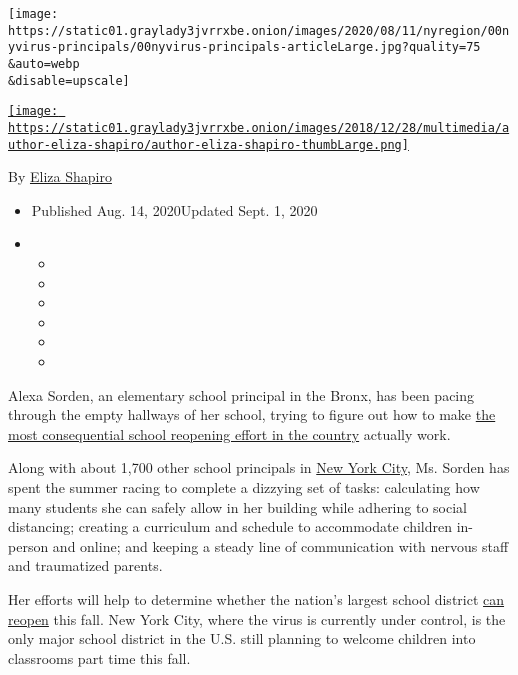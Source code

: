 \texttt{[image: https://static01.graylady3jvrrxbe.onion/images/2020/08/11/nyregion/00nyvirus-principals/00nyvirus-principals-articleLarge.jpg?quality=75\\\&auto=webp\\\&disable=upscale]}

\href{https://www.nytimes3xbfgragh.onion/by/eliza-shapiro}{\texttt{[image: https://static01.graylady3jvrrxbe.onion/images/2018/12/28/multimedia/author-eliza-shapiro/author-eliza-shapiro-thumbLarge.png]}}

By \href{https://www.nytimes3xbfgragh.onion/by/eliza-shapiro}{Eliza
Shapiro}

\begin{itemize}
\item
  Published Aug. 14, 2020Updated Sept. 1, 2020
\item
  \begin{itemize}
  \item
  \item
  \item
  \item
  \item
  \item
  \end{itemize}
\end{itemize}

Alexa Sorden, an elementary school principal in the Bronx, has been
pacing through the empty hallways of her school, trying to figure out
how to make
\href{https://www.nytimes3xbfgragh.onion/2020/08/05/nyregion/nyc-schools-reopening.html}{the
most consequential school reopening effort in the country} actually
work.

Along with about 1,700 other school principals in
\href{https://www.nytimes3xbfgragh.onion/2020/09/01/nyregion/schools-open-coronavirus-nyc.html}{New
York City}, Ms. Sorden has spent the summer racing to complete a
dizzying set of tasks: calculating how many students she can safely
allow in her building while adhering to social distancing; creating a
curriculum and schedule to accommodate children in-person and online;
and keeping a steady line of communication with nervous staff and
traumatized parents.

Her efforts will help to determine whether the nation's largest school
district
\href{https://www.nytimes3xbfgragh.onion/2020/08/07/nyregion/cuomo-schools-reopening.html}{can
reopen} this fall. New York City, where the virus is currently under
control, is the only major school district in the U.S. still planning to
welcome children into classrooms part time this fall.

